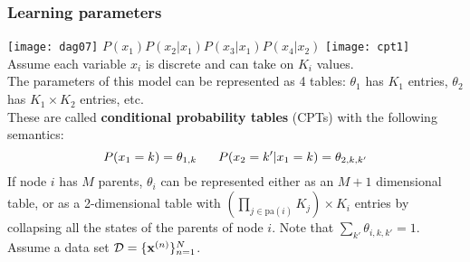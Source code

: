 

\newcommand{\foilhead}[1]{\end{frame} 
\frametitle{#1}
 \begin{frame}}
\newcommand{\bea}{\begin{eqnarray*}}
\newcommand{\eea}{\end{eqnarray*}}




\begin{frame}
\frametitle{Learning parameters}

\vspace*{-3ex}
\hspace{3ex} \texttt{[image: dag07]} \hspace{6ex} $P(x_1) P(x_2|x_1)
P(x_3|x_1) P(x_4|x_2)$ \hspace{6ex} \texttt{[image: cpt1]} \\[1ex]

Assume each variable $x_i$ is discrete and can take on $K_i$ values. \\[1ex]

The parameters of this model can be represented as 4 tables:
$\theta_1$ has $K_1$ entries, $\theta_2$ has $K_1 \times K_2$
entries, etc. \\[1ex]

These are called {\bf conditional probability tables} (CPTs) with the
following semantics:
\[
P(x_1 = k) = \theta_{1,k} \hspace{4ex} P(x_2 = k' | x_1 = k) = \theta_{2,k,k'} 
\]
If node $i$ has $M$ parents, $\theta_i$ can be represented either as
an $M+1$ dimensional table, or as a 2-dimensional table with $\left(\prod_{j
  \in \mathrm{pa}(i)} K_j \right) \times K_i $ entries by collapsing all
the states of the parents of node $i$. Note that $\sum_{k'}
\theta_{i,k,k'} = 1$.\\[2ex] 

Assume a data set $\mathcal{D} = \{ \mathbf x^{(n)} \}_{n=1}^N$. \hfill  {}


\end{frame}
